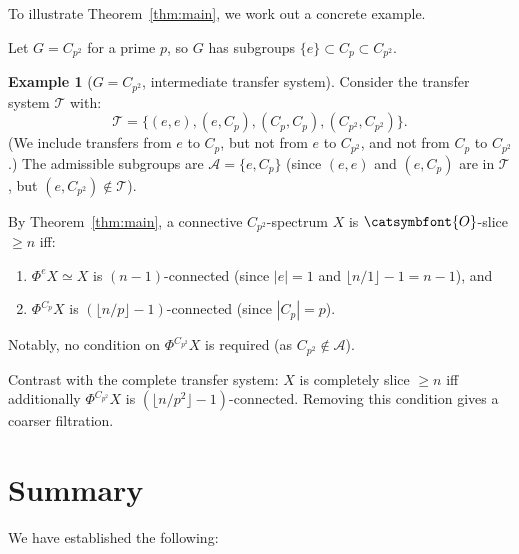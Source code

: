 \documentclass[12pt]{article}
\newcommand{\aO}{{\catsymbfont{O}}}
\newcommand{\aT}{{\mathcal{T}}}
\theoremstyle{definition}
\newtheorem{example}[theorem]{Example}
\begin{document}
To illustrate Theorem~\ref{thm:main}, we work out a concrete example.

Let $G = C_{p^2}$ for a prime $p$, so $G$ has subgroups $\{e\} \subset C_p \subset C_{p^2}$.

\begin{example}[$G = C_{p^2}$, intermediate transfer system]\label{ex:Cp2}
Consider the transfer system $\aT$ with:
\[
   \aT = \{(e, e), (e, C_p), (C_p, C_p), (C_{p^2}, C_{p^2})\}.
\]
(We include transfers from $e$ to $C_p$, but not from $e$ to $C_{p^2}$, and not from $C_p$ to $C_{p^2}$.)  The admissible subgroups are $\mathcal{A} = \{e, C_p\}$ (since $(e,e)$ and $(e,C_p)$ are in $\aT$, but $(e, C_{p^2})\notin\aT$).

By Theorem~\ref{thm:main}, a connective $C_{p^2}$-spectrum $X$ is $\aO$-slice $\geq n$ iff:
\begin{enumerate}[label=(\alph*)]
   \item $\Phi^e X \simeq X$ is $(n-1)$-connected (since $|e|=1$ and $\lfloor n/1\rfloor - 1 = n-1$), and
   \item $\Phi^{C_p} X$ is $(\lfloor n/p\rfloor - 1)$-connected (since $|C_p| = p$).
\end{enumerate}
Notably, no condition on $\Phi^{C_{p^2}} X$ is required (as $C_{p^2}\notin\mathcal{A}$).

Contrast with the complete transfer system: $X$ is completely slice $\geq n$ iff additionally $\Phi^{C_{p^2}} X$ is $(\lfloor n/p^2\rfloor - 1)$-connected.  Removing this condition gives a coarser filtration.
\end{example}

\section{Summary}

We have established the following:
\end{document}
